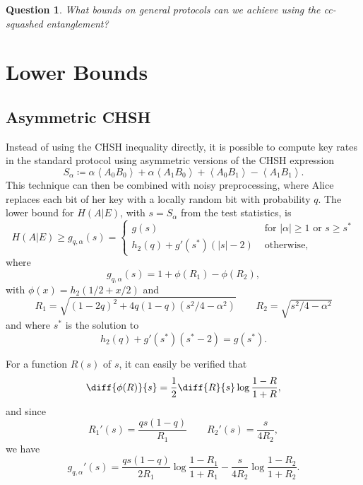 \documentclass[10pt, a4paper]{article}
\numberwithin{equation}{section} %
\theoremstyle{definition}
\theoremstyle{plain}
\newtheorem{question}{Question}
\newcommand{\abs}[1]{\left\lvert#1\right\rvert}
\newcommand{\?}{\mathrel{?}} %
\newcommand{\angleb}[1]{\left\langle #1 \right\rangle} %
\begin{document}
      \begin{question}
        What bounds on general protocols can we achieve using the cc-squashed entanglement?
      \end{question}

      \section{Lower Bounds}\label{sec:lbound}

      \subsection{Asymmetric CHSH}

      Instead of using the CHSH inequality directly, it is possible to compute key rates in the standard protocol using asymmetric versions of the CHSH expression
      \begin{equation}
        S_{\alpha} \coloneqq \alpha\angleb{A_0 B_0} + \alpha\angleb{A_1 B_0} + \angleb{A_0 B_1} - \angleb{A_1 B_1}.
      \end{equation}
      This technique can then be combined with noisy preprocessing, where Alice replaces each bit of her key with a locally random bit with probability \(q\). The lower bound for \(H(A|E)\), with \(s = S_{\alpha}\) from the test statistics, is
      \begin{equation} H(A|E) \geq g_{q,\alpha}(s) = \begin{cases}
        g(s) & \text{ for } \abs{\alpha} \geq 1 \text{ or } s \geq s^* \\
        h_2(q) + g'(s^*)(\abs{s}-2) & \text{ otherwise},
      \end{cases}
    \end{equation}
    where
    \begin{equation}
      g_{q,\alpha}(s) = 1 + \phi\left(R_1\right) - \phi\left(R_2\right),
    \end{equation}
    with \(\phi(x) = h_2(1/2 + x/2)\) and
    \begin{equation} 
      R_1 = \sqrt{{(1-2q)}^2 + 4q(1-q)(s^2/4-\alpha^2)} \qquad R_2 = \sqrt{s^2/4-\alpha^2}
    \end{equation}
    and where \(s^*\) is the solution to
    \begin{equation}\label{eqn:sstar}
      h_2(q) + g'(s^*) (s^*-2) = g(s^*).
    \end{equation}

    For a function \(R(s)\) of \(s\), it can easily be verified that
    \begin{equation}
      \diff{\phi(R)}{s} = \frac{1}{2} \diff{R}{s} \log\frac{1-R}{1+R},
    \end{equation}
    and since
    \begin{equation} 
      R_1'(s) = \frac{qs(1-q)}{R_1} \qquad R_2'(s) = \frac{s}{4R_2},
    \end{equation}
    we have
    \begin{equation}\label{eqn:diffg}
      g_{q,\alpha}'(s) = \frac{qs(1-q)}{2R_1} \log\frac{1-R_1}{1+R_1} - \frac{s}{4R_2} \log\frac{1-R_2}{1+R_2}.
    \end{equation}
\end{document}
